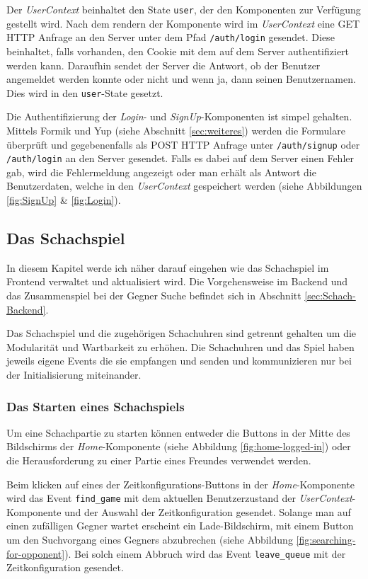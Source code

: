 Der \textit{UserContext} beinhaltet den State \verb|user|, der den Komponenten zur Verfügung gestellt wird.
Nach dem rendern der Komponente wird im \textit{UserContext} eine GET HTTP Anfrage an den Server unter dem Pfad \verb|/auth/login| gesendet. Diese beinhaltet, falls vorhanden, den Cookie mit dem auf dem Server authentifiziert werden kann. Daraufhin sendet der Server die Antwort, ob der Benutzer angemeldet werden konnte oder nicht und wenn ja, dann seinen Benutzernamen.
Dies wird in den \verb|user|-State gesetzt.

Die Authentifizierung der \textit{Login}- und \textit{SignUp}-Komponenten ist simpel gehalten. Mittels Formik und Yup (siehe Abschnitt \ref{sec:weiteres}) werden die Formulare überprüft und gegebenenfalls als POST HTTP Anfrage unter \verb|/auth/signup| oder \verb|/auth/login| an den Server gesendet. Falls es dabei auf dem Server einen Fehler gab, wird die Fehlermeldung angezeigt oder man erhält als Antwort die Benutzerdaten, welche in den \textit{UserContext} gespeichert werden (siehe Abbildungen \ref{fig:SignUp} \& \ref{fig:Login}).
        
        \subsection{Das Schachspiel}
        \label{sec:Schachspiel}
        In diesem Kapitel werde ich näher darauf eingehen wie das Schachspiel im Frontend verwaltet und aktualisiert wird. Die Vorgehensweise im Backend und das Zusammenspiel bei der Gegner Suche befindet sich in Abschnitt \ref{sec:Schach-Backend}.
        
Das Schachspiel und die zugehörigen Schachuhren sind getrennt gehalten um die Modularität und Wartbarkeit zu erhöhen. Die Schachuhren und das Spiel haben jeweils eigene Events die sie empfangen und senden und kommunizieren nur bei der Initialisierung miteinander.
		\subsubsection{Das Starten eines Schachspiels}
		\label{sec:Frontend-Schach-Start}
Um eine Schachpartie zu starten können entweder die Buttons in der Mitte des Bildschirms der \textit{Home}-Komponente (siehe Abbildung \ref{fig:home-logged-in}) oder die Herausforderung zu einer Partie eines Freundes verwendet werden.

Beim klicken auf eines der Zeitkonfigurations-Buttons in der \textit{Home}-Komponente wird das Event \verb|find_game| mit dem aktuellen Benutzerzustand der \textit{UserContext}-Komponente und der Auswahl der Zeitkonfiguration gesendet. Solange man auf einen zufälligen Gegner wartet erscheint ein Lade-Bildschirm, mit einem Button um den Suchvorgang eines Gegners abzubrechen (siehe Abbildung \ref{fig:searching-for-opponent}). Bei solch einem Abbruch wird das Event \verb|leave_queue| mit der Zeitkonfiguration gesendet.

